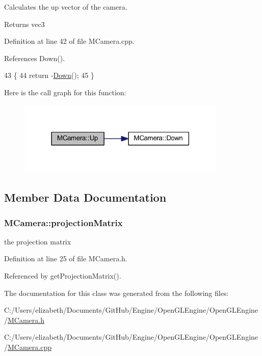 Calculates the up vector of the camera. 

\begin{DoxyReturn}{Returns}
vec3 
\end{DoxyReturn}


Definition at line 42 of file M\+Camera.\+cpp.



References Down().


\begin{DoxyCode}
43 \{
44     \textcolor{keywordflow}{return} -\hyperlink{class_m_camera_a31bf2dae9dd70fce430afa8342a60b7a}{Down}();
45 \}
\end{DoxyCode}


Here is the call graph for this function\+:\nopagebreak
\begin{figure}[H]
\begin{center}
\leavevmode
\includegraphics[width=282pt]{class_m_camera_a315ae964f137919c9f285e6fcad0c2c1_cgraph}
\end{center}
\end{figure}




\subsection{Member Data Documentation}
\subsubsection[{\texorpdfstring{projection\+Matrix}{projectionMatrix}}]{ M\+Camera\+::projection\+Matrix\hspace{0.3cm}{\ttfamily [private]}}\hypertarget{class_m_camera_af2adbeea14ebcd69bbe03df1e8c33d3c}{}\label{class_m_camera_af2adbeea14ebcd69bbe03df1e8c33d3c}


the projection matrix 



Definition at line 25 of file M\+Camera.\+h.



Referenced by get\+Projection\+Matrix().



The documentation for this class was generated from the following files\+:\begin{DoxyCompactItemize}
\item 
C\+:/\+Users/elizabeth/\+Documents/\+Git\+Hub/\+Engine/\+Open\+G\+L\+Engine/\+Open\+G\+L\+Engine/\hyperlink{_m_camera_8h}{M\+Camera.\+h}\item 
C\+:/\+Users/elizabeth/\+Documents/\+Git\+Hub/\+Engine/\+Open\+G\+L\+Engine/\+Open\+G\+L\+Engine/\hyperlink{_m_camera_8cpp}{M\+Camera.\+cpp}\end{DoxyCompactItemize}
